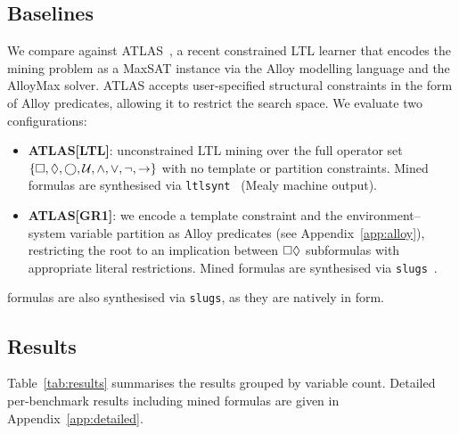 \subsection{Baselines}\label{sec:baselines}

We compare \toolname against ATLAS~\cite{ZhangCGD25}, a recent
constrained LTL learner that encodes the mining problem as a
MaxSAT instance via the Alloy modelling language and
the AlloyMax solver.
ATLAS accepts user-specified structural constraints in the form of
Alloy predicates, allowing it to restrict the search space.
We evaluate two configurations:

\begin{itemize}
\item \textbf{ATLAS[LTL]}: unconstrained LTL mining over the full
  operator set $\{\square, \Diamond, \bigcirc, \mathbin{\mathcal{U}}, \land, \lor,
  \lnot, \rightarrow\}$ with no template or partition constraints.
  Mined formulas are synthesised via
  \texttt{ltlsynt}~\cite{MichaudC18} (Mealy machine output).
\item \textbf{ATLAS[GR1]}: we encode a \GRone template constraint
  and the environment--system variable partition as Alloy predicates
  (see Appendix~\ref{app:alloy}),
  restricting the root to an implication between
  $\square\Diamond$ subformulas with appropriate literal
  restrictions.
  Mined formulas are synthesised via
  \texttt{slugs}~\cite{EhlersR16}.
\end{itemize}

\noindent
\toolname formulas are also synthesised via \texttt{slugs},
as they are natively in \GRone form.

\subsection{Results}\label{sec:results}

Table~\ref{tab:results} summarises the results grouped by
variable count.
Detailed per-benchmark results including mined formulas are given
in Appendix~\ref{app:detailed}.

